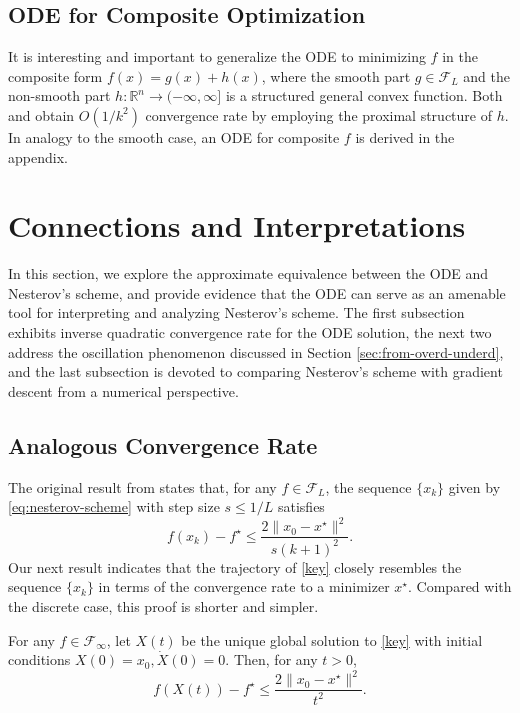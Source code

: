 \documentclass[twoside,11pt]{article}
\newcommand{\norm}[1]{\|#1\|}
\newcommand{\R}{\mathbb{R}}
\newcommand{\goto}{\rightarrow}
\begin{document}
\subsection{ODE for Composite Optimization}
\label{sec:extension-non-smooth}
It is interesting and important to generalize the ODE to minimizing $f$ in the composite form $f(x) = g(x) + h(x)$, where the smooth part $g\in \mathcal{F}_{L}$ and the non-smooth part $h:\R^n\goto(-\infty,\infty]$ is a structured general convex function. Both \cite{nesterov_compo} and \cite{BeckTeboulle} obtain $O(1/k^2)$ convergence rate by employing the proximal structure of $h$. In analogy to the smooth case, an ODE for composite $f$ is derived in the appendix.

\section{Connections and Interpretations}
\label{sec:interpret}
In this section, we explore the approximate equivalence between the ODE and Nesterov's scheme, and provide evidence that the ODE can serve as an amenable tool for interpreting and analyzing Nesterov's scheme. The first subsection exhibits inverse quadratic convergence rate for the ODE solution, the next two address the oscillation phenomenon discussed in Section \ref{sec:from-overd-underd}, and the last subsection is devoted to comparing Nesterov's scheme with gradient descent from a numerical perspective.

\subsection{Analogous Convergence Rate}
\label{sec:complex}
The original result from \citet{nesterov} states that, for any $f\in\mathcal{F}_L$, the sequence $\{x_k\}$ given by \eqref{eq:nesterov-scheme} with step size $s \le 1/L$ satisfies
\begin{equation}\label{eq:nesterov_ineq}
f(x_k) - f^\star \le \frac{2\|x_0 - x^\star\|^2}{s(k+1)^2}.
\end{equation}
Our next result indicates that the trajectory of \eqref{key} closely resembles the sequence $\{x_k\}$ in terms of the convergence rate to a minimizer $x^\star$. Compared with the discrete case, this proof is shorter and simpler.
\begin{theorem}\label{thm:ode_rate}
For any $f\in\mathcal{F}_{\infty}$, let $X(t)$ be the unique global solution to \eqref{key} with initial conditions $X(0) = x_0, \dot X(0) = 0$. Then, for any $t > 0$,
\begin{equation}\label{eq:t_2_rate}
f(X(t)) - f^\star \le \frac{2\norm{x_0-x^\star}^2}{t^2}.
\end{equation}
\end{theorem}
\end{document}
